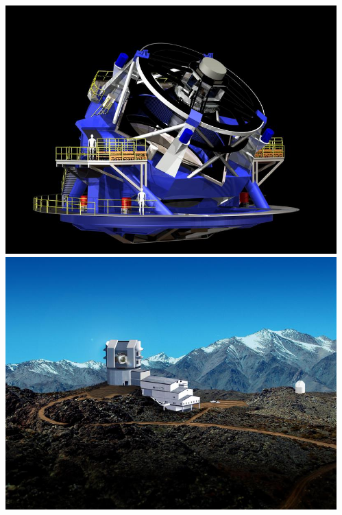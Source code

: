\documentclass{beamer}
\begin{document}
{\begin{columns}
\begin{column}{0.5\textwidth}
\begin{itemize}
            \end{itemize}
        \end{column}
        \begin{column}{0.5\textwidth}    
            \includegraphics[width=\textwidth]{Telescope_Side_2-140-scaled.jpg}
            \newline
            \includegraphics[width=\textwidth]{LSST_Rendering_VK_scaled.jpg}
        \end{column}
    \end{columns}
}
\end{document}

